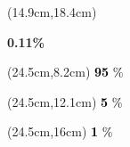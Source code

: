\documentclass[
  11pt,
  landscape]{article}
\begin{document}
\begin{textblock*}{5cm}(14.9cm,18.4cm) %
    \centerline{\textbf{0.11\%}}
\end{textblock*}

\begin{textblock*}{2cm}(24.5cm,8.2cm) %
  \huge \textcolor{black}{\textbf{95} \huge \%}
\end{textblock*}

\begin{textblock*}{2cm}(24.5cm,12.1cm) %
  \huge \textcolor{black}{\textbf{5} \huge \%}
\end{textblock*}

\begin{textblock*}{2cm}(24.5cm,16cm) %
  \huge \textcolor{black}{\textbf{1} \huge \%}
\end{textblock*}

\vspace{2.75em}
\end{document}

